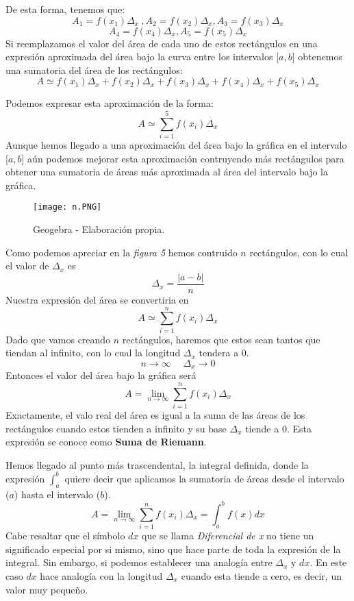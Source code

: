 \documentclass[twocolumn]{article}
\begin{document}
\begin{justify}
  De esta forma, tenemos que: \[A_1=f(x_1)\Delta_x\ , A_2=f(x_2)\Delta_x, A_3=f(x_3)\Delta_x\]\[ A_4=f(x_4)\Delta_x,A_5=f(x_5)\Delta_x\]
  Si reemplazamos el valor del área de cada uno de estos rectángulos en una expresión aproximada del área bajo la curva entre los intervalos [\(a,b\)] obtenemos una sumatoria del área de los rectángulos:
  \[A\simeq f(x_1)\Delta_x + f(x_2)\Delta_x + f(x_3)\Delta_x + f(x_4)\Delta_x + f(x_5)\Delta_x \]
\end{justify}

\begin{justify}
  Podemos expresar esta aproximación de la forma: \[A \simeq \sum_{i = 1}^{5}f(x_i)\Delta_x  \] Aunque hemos llegado a una aproximación del área bajo la gráfica en el intervalo [\(a,b\)] aún podemos mejorar esta aproximación contruyendo más rectángulos para obtener una sumatoria de áreas más aproximada al área del intervalo bajo la gráfica.
\end{justify}

\begin{figure}[H]
  \centering
  \texttt{[image: n.PNG]}
  \caption{Geogebra - Elaboración propia.}  
\end{figure}

\begin{justify}
  Como podemos apreciar en la \textit{figura 5} hemos contruido \(n\) rectángulos, con lo cual el valor de \(\Delta_x\) es \[\Delta_x = \frac{\left\lvert a - b \right\rvert }{n}\] Nuestra expresión del área se convertiria en 
  \[A \simeq \sum_{i = 1}^{n}f(x_i)\Delta_x \] Dado que vamos creando \(n\) rectángulos, haremos que estos sean tantos que tiendan al infinito, con lo cual la longitud \( \Delta_x\) tendera a \(0.\) \[n \rightarrow \infty \; \, \; \; \; \Delta_x \rightarrow 0\]
  Entonces el valor del área bajo la gráfica será \[A=\lim_{n \to \infty}\sum_{i = 1}^{n}f(x_i)\Delta_x  \] Exactamente, el valo real del área es igual a la suma de las áreas de los rectángulos cuando estos tienden a infinito y su base \(\Delta_x\) tiende a \(0\).
  Esta expresión se conoce como \textbf{Suma de Riemann}.
\end{justify}
\begin{justify}
  Hemos llegado al punto más trascendental, la integral definida, donde la expresión \( \int_{a}^{b}\) quiere decir que aplicamos la sumatoria de áreas desde el intervalo (\(a\)) hasta el intervalo (\(b\)). \[A=\lim_{n \to \infty}\sum_{i = 1}^{n}f(x_i)\Delta_x = \int_{a}^{b}f(x)dx\] 
  Cabe resaltar que el símbolo \(dx\) que se llama \textit{Diferencial de x} no tiene un significado especial por si mismo, sino que hace parte de toda la expresión de la integral. Sin embargo, si podemos establecer una analogía entre \(\Delta_x\) y \(dx\). En este caso \(dx\) hace analogía con la longitud \(\Delta_x\) cuando esta tiende a cero, es decir, un valor muy pequeño.
\end{justify}
\end{document}
